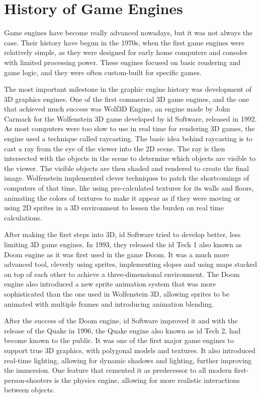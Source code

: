 \newpage
\section{History of Game Engines}
\label{sec:history_game_engines}
\hspace{\parindent}
Game engines have become really advanced nowadays, but it was not always the case. Their history have begun in the 1970s, when the first game engines were relatively simple, as they were designed for early home computers and consoles with limited processing power. These engines focused on basic rendering and game logic, and they were often custom-built for specific games.

The most important milestone in the graphic engine history was development of 3D graphics engines. One of the first commercial 3D game engines, and the one that achieved much success was Wolf3D Engine, an engine made by John Carmack for the Wolfenstein 3D game developed by id Software, released in 1992. As most computers were too slow to use in real time for rendering 3D games, the engine used a technique called raycasting. The basic idea behind raycasting is to cast a ray from the eye of the viewer into the 2D scene. The ray is then intersected with the objects in the scene to determine which objects are visible to the viewer. The visible objects are then shaded and rendered to create the final image. Wolfenstein implemented clever techniques to patch the shortcomings of computers of that time, like using pre-calculated textures for its walls and floors, animating the colors of textures to make it appear as if they were moving or using 2D sprites in a 3D environment to lessen the burden on real time calculations.

After making the first steps into 3D, id Software tried to develop better, less limiting 3D game engines. In 1993, they released the id Tech 1 also known as Doom engine as it was first used in the game Doom. It was a much more advanced tool, cleverly using sprites, implementing slopes and using maps stacked on top of each other to achieve a three-dimensional environment. The Doom engine also introduced a new sprite animation system that was more sophisticated than the one used in Wolfenstein 3D, allowing sprites to be animated with multiple frames and introducing animation blending. 

After the success of the Doom engine, id Software improved it and with the release of the Quake in 1996, the Quake engine also known as id Tech 2, had become known to the public. It was one of the first major game engines to support true 3D graphics, with polygonal models and textures. It also introduced real-time lighting, allowing for dynamic shadows and lighting, further improving the immersion. One feature that cemented it as predecessor to all modern first-person-shooters is the physics engine, allowing for more realistic interactions between objects.

